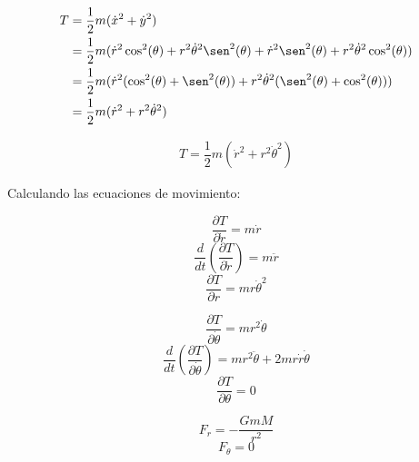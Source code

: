 \documentclass[letter,11pt]{article}
\begin{document}
\begin{equation*}
\begin{split}
    T&=\frac{1}{2}m(\dot{x}^2+\dot{y}^2)\\
     &=\frac{1}{2}m(
           \dot{r}^2\cos^2(\theta)+
           r^2\dot{\theta}^2\sen^2(\theta)+
           \dot{r}^2\sen^2(\theta)+
           r^2\dot{\theta}^2\cos^2(\theta)
       )\\
     &=\frac{1}{2}m(
           \dot{r}^2(
               \cos^2(\theta)+\sen^2(\theta)
           )+
           r^2\dot{\theta}^2(
               \sen^2(\theta)+\cos^2(\theta)
           )
       )\\
     &=\frac{1}{2}m(\dot{r}^2+r^2\dot{\theta}^2)
\end{split}
\end{equation*}

\begin{equation}
\boxed{\begin{array}{l}
    T=\dfrac{1}{2}m(\dot{r}^2+r^2\dot{\theta}^2)
\end{array}}
\label{ec01}
\end{equation}

Calculando las ecuaciones de movimiento:

\begin{equation*}
    \frac{\partial T}{\partial \dot{r}}=m\dot{r}
\end{equation*}
\begin{equation*}
    \frac{d}{dt}\left(\frac{\partial T}{\partial \dot{r}}\right)=m\ddot{r}
\end{equation*}
\begin{equation*}
    \frac{\partial T}{\partial r}=mr\dot{\theta}^2
\end{equation*}

\begin{equation*}
    \frac{\partial T}{\partial \dot{\theta}}=mr^2\dot{\theta}
\end{equation*}
\begin{equation*}
    \frac{d}{dt}\left(
        \frac{\partial T}{\partial \dot{\theta}}
    \right)=mr^2\ddot{\theta}+2mr\dot{r}\dot{\theta}
\end{equation*}
\begin{equation*}
    \frac{\partial T}{\partial \theta}=0
\end{equation*}

\begin{equation*}
    F_r=-\frac{GmM}{r^2}
\end{equation*}
\begin{equation*}
    F_{\theta}=0
\end{equation*}
\end{document}

